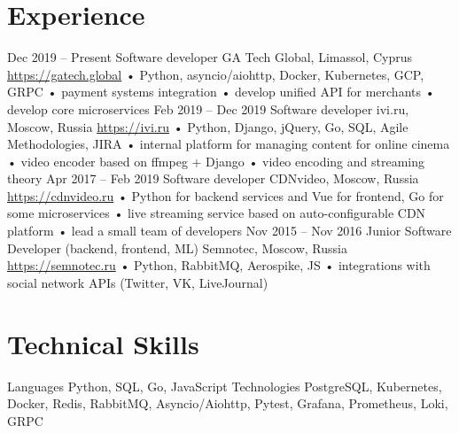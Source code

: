 \documentclass[11pt,a4paper]{moderncv}
\begin{document}
\maketitle

\section{Experience}
\cventry
  {Dec 2019 – Present}
  {Software developer}
  {GA Tech Global, Limassol, Cyprus}
  {\newline{}\url{https://gatech.global}}{}
  {
    • Python, asyncio/aiohttp, Docker, Kubernetes, GCP, GRPC\newline{}
    • payment systems integration\newline{}
    • develop unified API for merchants\newline{}
    • develop core microservices\newline{}
  }
\cventry
  {Feb 2019 – Dec 2019}
  {Software developer}
  {ivi.ru, Moscow, Russia}
  {\newline{}\url{https://ivi.ru}}{}
  {
    • Python, Django, jQuery, Go, SQL, Agile Methodologies, JIRA\newline{}
    • internal platform for managing content for online cinema\newline{}
    • video encoder based on ffmpeg + Django\newline{}
    • video encoding and streaming theory\newline{}
   }
\cventry
  {Apr 2017 – Feb 2019}
  {Software developer}
  {CDNvideo, Moscow, Russia}
  {\newline{}\url{https://cdnvideo.ru}}{}
  {
    • Python for backend services and Vue for frontend, Go for some microservices\newline{}
    • live streaming service based on auto-configurable CDN platform\newline{}
    • lead a small team of developers\newline{}
   }
\cventry
  {Nov 2015 – Nov 2016}
  {Junior Software Developer (backend, frontend, ML)}
  {Semnotec, Moscow, Russia}
  {\newline{}\url{https://semnotec.ru}}{}
  {
    • Python, RabbitMQ, Aerospike, JS\newline{}
    • integrations with social network APIs (Twitter, VK, LiveJournal)\newline{}
   }

\section{Technical Skills}
\cvline
  {Languages}{
    Python,
    SQL,
    Go,
    JavaScript
  }
\cvline
  {Technologies}{
    PostgreSQL,
    Kubernetes,
    Docker,
    Redis,
    RabbitMQ,
    Asyncio/Aiohttp,
    Pytest,
    Grafana,
    Prometheus,
    Loki,
    GRPC
  }
\end{document}
